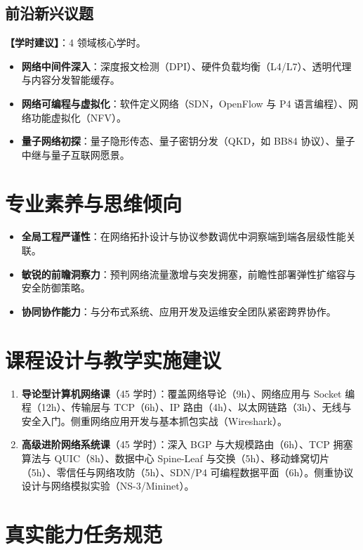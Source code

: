 \subsection{前沿新兴议题}
\textbf{【学时建议】}：4 领域核心学时。

\begin{itemize}
    \item \textbf{网络中间件深入}：深度报文检测（DPI）、硬件负载均衡（L4/L7）、透明代理与内容分发智能缓存。
    \item \textbf{网络可编程与虚拟化}：软件定义网络（SDN，OpenFlow 与 P4 语言编程）、网络功能虚拟化（NFV）。
    \item \textbf{量子网络初探}：量子隐形传态、量子密钥分发（QKD，如 BB84 协议）、量子中继与量子互联网愿景。
\end{itemize}

\section{专业素养与思维倾向}

\begin{itemize}
    \item \textbf{全局工程严谨性}：在网络拓扑设计与协议参数调优中洞察端到端各层级性能关联。
    \item \textbf{敏锐的前瞻洞察力}：预判网络流量激增与突发拥塞，前瞻性部署弹性扩缩容与安全防御策略。
    \item \textbf{协同协作能力}：与分布式系统、应用开发及运维安全团队紧密跨界协作。
\end{itemize}

\section{课程设计与教学实施建议}

\begin{enumerate}
    \item \textbf{导论型计算机网络课}（45 学时）：覆盖网络导论（9h）、网络应用与 Socket 编程（12h）、传输层与 TCP（6h）、IP 路由（4h）、以太网链路（3h）、无线与安全入门。侧重网络应用开发与基本抓包实战（Wireshark）。
    \item \textbf{高级进阶网络系统课}（45 学时）：深入 BGP 与大规模路由（6h）、TCP 拥塞算法与 QUIC（8h）、数据中心 Spine-Leaf 与交换（5h）、移动蜂窝切片（5h）、零信任与网络攻防（5h）、SDN/P4 可编程数据平面（6h）。侧重协议设计与网络模拟实验（NS-3/Mininet）。
\end{enumerate}

\section{真实能力任务规范}

